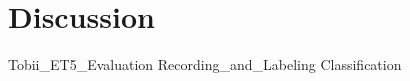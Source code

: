 \chapter{Discussion} \label{ch:disc}

{Tobii_ET5_Evaluation}
{Recording_and_Labeling}
{Classification}





